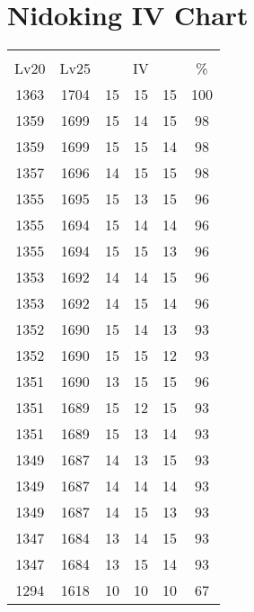 \documentclass{article}%
\begin{document}
%
\normalsize%
\section{Nidoking IV Chart}%
\label{sec:Nidoking IV Chart}%
\renewcommand{\arraystretch}{1.5}%
\begin{tabular}{|c|c|c|c|c|c|}%
\hline%
\multicolumn{6}{|c|}{\textcolor{white}{ 
\linebreak{Nidoking}
}%
\cellcolor{black}}\\%
\multicolumn{1}{|c}{Lv20}&\multicolumn{1}{c|}{Lv25}&\multicolumn{3}{c|}{IV}&\multicolumn{1}{|c|}{\%}\\%
\hline%
\rowcolor{color100}%
1363&1704&15&15&15&100\\%
\hline%
\rowcolor{color98}%
1359&1699&15&14&15&98\\%
\hline%
\rowcolor{color98}%
1359&1699&15&15&14&98\\%
\hline%
\rowcolor{color98}%
1357&1696&14&15&15&98\\%
\hline%
\rowcolor{color96}%
1355&1695&15&13&15&96\\%
\hline%
\rowcolor{color96}%
1355&1694&15&14&14&96\\%
\hline%
\rowcolor{color96}%
1355&1694&15&15&13&96\\%
\hline%
\rowcolor{color96}%
1353&1692&14&14&15&96\\%
\hline%
\rowcolor{color96}%
1353&1692&14&15&14&96\\%
\hline%
\rowcolor{color93}%
1352&1690&15&14&13&93\\%
\hline%
\rowcolor{color93}%
1352&1690&15&15&12&93\\%
\hline%
\rowcolor{color96}%
1351&1690&13&15&15&96\\%
\hline%
\rowcolor{color93}%
1351&1689&15&12&15&93\\%
\hline%
\rowcolor{color93}%
1351&1689&15&13&14&93\\%
\hline%
\rowcolor{color93}%
1349&1687&14&13&15&93\\%
\hline%
\rowcolor{color93}%
1349&1687&14&14&14&93\\%
\hline%
\rowcolor{color93}%
1349&1687&14&15&13&93\\%
\hline%
\rowcolor{color93}%
1347&1684&13&14&15&93\\%
\hline%
\rowcolor{color93}%
1347&1684&13&15&14&93\\%
\hline%
\rowcolor{color91}%
1294&1618&10&10&10&67\\%
\end{tabular}

%
\end{document}
